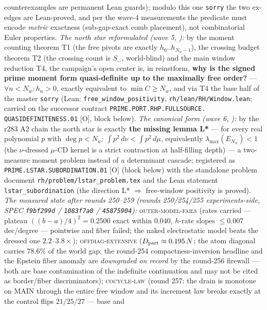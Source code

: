 \documentclass[11pt,a4paper]{article}
\begin{document}
{counterexamples are permanent Lean guards); modulo this one
\texttt{sorry} the two ex-edges are Lean-proved, and per the
wave-4 measurements the predicate must encode \emph{metric}
exactness (sub-gap-exact comb placement), not combinatorial Euler
properties.  \emph{The north star reformulated (wave 5,
):} by the moment
counting theorem T1 (the free pivots are exactly
$h_0..h_{N_w-1}$), the crossing budget theorem T2 (the crossing
count is $S_-$, world-blind) and the main window reduction T4,
the campaign's open center is, in reinstform, \textbf{why is the
signed prime moment form quasi-definite up to the maximally free
order?} --- $\forall n < N_w : h_n > 0$, exactly equivalent to
$\min C \ge N_w$, and via T4 the base half of the master
\texttt{sorry} (Lean: \texttt{free\_window\_positivity},
\texttt{rh/lean/RH/Window.lean}; carried on the successor
contract \texttt{PRIME.PORT.RHP.FULLSOURCE.\allowbreak
QUASIDEFINITENESS.01} [O], block below).  \emph{The canonical
form (wave 6, ):}
by the r283 A2 chain the north star is exactly \textbf{the
missing lemma L*} --- for every real polynomial $p$ with $\deg
p < N_w$: $\int p^2\,d\nu < \int p^2\,d\mu$, equivalently
$\lambda_{\max}(E_{N_w}) < 1$ (the $\nu$-dressed $\mu$-CD kernel
is a strict contraction at half-filling depth) --- a two-measure
moment problem instead of a determinant cascade; registered as
\texttt{PRIME.LSTAR.\allowbreak SUBORDINATION.01} [O] (block
below) with the standalone problem document
\texttt{rh/problem/lstar\_problem.tex} and the Lean statement
\texttt{lstar\_subordination} (the direction L* $\Rightarrow$
free-window positivity is proved).  \emph{The measured
state after
rounds 250--259 (rounds 250/254/255 experiments-side, SPEC
\texttt{f9bf299d} / \texttt{1083f7a0} / \texttt{45875904}):}
\textsc{outer-model-fails} (rates carried
--- plateau $((b-a)/4)^2 = 0.2500$ exact within $0.040$, $h$-rate
slopes $\le 0.007$ dec/degree --- pointwise and fiber failed; the
naked electrostatic model beats the dressed one
$2.2$--$3.8\times$); \textsc{offdiag-extensive} ($D_{\rm part}
\approx 0.195\,N$; the atom diagonal carries $78.6\%$ of the
world gap; the round-254 compactness-inversion headline and the
Epstein fiber anomaly are \emph{downgraded on record} by the
round-256 firewall --- both are base contamination of the
indefinite continuation and may not be cited as border/fiber
discriminators); \textsc{cocycle-law} (round 257: the drain is
monotone on MAIN through the entire free window and its increment
law breaks exactly at the control flips $21/25/27$ --- base and
}
\end{document}
